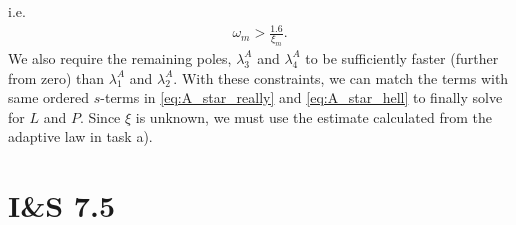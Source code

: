 \documentclass[]{article}
\begin{document}
i.e.
\begin{equation}\begin{aligned}
\omega_m > \frac{1.6}{\xi_m}.
\end{aligned}\end{equation}
We also require the remaining poles, $\lambda_3^A$ and $\lambda_4^A$ to be sufficiently faster (further from zero) than $\lambda_1^A$ and $\lambda_2^A$. With these constraints, we can match the terms with same ordered $s$-terms in \eqref{eq:A_star_really} and \eqref{eq:A_star_hell} to finally solve for $L$ and $P$. Since $\xi$ is unknown, we must use the estimate calculated from the adaptive law in task a).

\section{I\&S 7.5}
\end{document}
